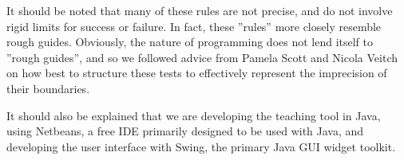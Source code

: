 It should be noted that many of these rules are not precise, and do not involve rigid limits for success or failure. In fact, these ''rules'' more closely resemble rough guides. Obviously, the nature of programming does not lend itself to ''rough guides'', and so we followed advice from Pamela Scott and Nicola Veitch on how best to structure these tests to effectively represent the imprecision of their boundaries.  

It should also be explained that we are developing the teaching tool in Java, using Netbeans, a free IDE primarily designed to be used with Java, and developing the user interface with Swing, the primary Java GUI widget toolkit.
